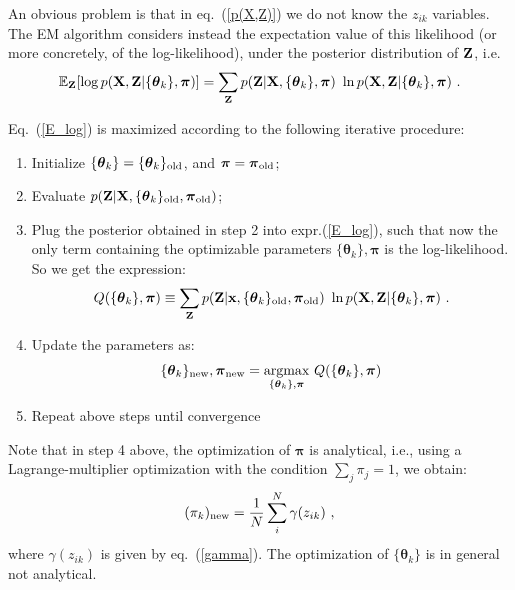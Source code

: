 \documentclass[12pt, a4paper]{article}
\newcommand{\bx}{{\bf x}}
\newcommand{\btheta}{\boldsymbol{\theta}}
\begin{document}
An obvious problem is that in eq.~(\ref{p(X,Z)}) we do not know the $z_{ik}$ variables. The EM algorithm considers instead the expectation value of this likelihood (or more concretely, of the log-likelihood), under the posterior distribution of ${\bf Z}$, i.e.
\begin{equation}
\label{E_log}
\mathbb{E}_{\bf Z} 
[\log p({\bf X,Z}|\{\btheta_k\},\boldsymbol{\pi}) ] =
\sum_{\bf Z} 
p({\bf Z}|{\bf X},\{\btheta_k\},\boldsymbol{\pi})~
\ln p({\bf X,Z}|\{\btheta_k\},\boldsymbol{\pi})~.
\end{equation}

Eq.~(\ref{E_log}) is maximized according to the following iterative procedure:
\begin{enumerate}
    \item Initialize $\{\btheta_k\}=\{\btheta_k\}_{\rm old}$, and $\boldsymbol{\pi} = \boldsymbol{\pi}_{\rm old}$;
    \item Evaluate $p({\bf Z}|{\bf X},\{\btheta_k\}_{\rm old},\boldsymbol{\pi}_{\rm old})$;
    \item Plug the posterior obtained in step 2 into expr.(\ref{E_log}), such that now the only term containing the optimizable parameters $\{\btheta_k\},\boldsymbol{\pi}$ is the log-likelihood. So we get the expression:
    \begin{equation}
      Q(\{\btheta_k\},\boldsymbol{\pi}) \equiv
     \sum_{\bf Z} 
    p({\bf Z}|\bx,\{\btheta_k\}_{\rm old},\boldsymbol{\pi}_{\rm old})~
\ln p({\bf X,Z}|\{\btheta_k\},\boldsymbol{\pi})~.  
    \end{equation}
    \item Update the parameters as:
    \begin{equation}
      \{\btheta_k\}_{\rm new},\boldsymbol{\pi}_{\rm new} =
      \underset{\{\btheta_k\},\boldsymbol{\pi}}
      {\rm argmax}~Q(\{\btheta_k\},\boldsymbol{\pi})
    \end{equation}
    \item Repeat above steps until convergence
\end{enumerate}
Note that in step 4 above, the optimization of $\boldsymbol{\pi}$ is analytical, i.e., using a Lagrange-multiplier optimization with the condition $\sum_j \pi_j = 1$, we obtain:
\begin{equation}
    (\pi_k)_{\rm new} = \frac{1}{N}\sum_i^N \gamma(z_{ik})~,
\end{equation}
where $\gamma(z_{ik})$ is given by eq.~(\ref{gamma}). The optimization of $\{\btheta_k\}$ is in general not analytical.
\end{document}

